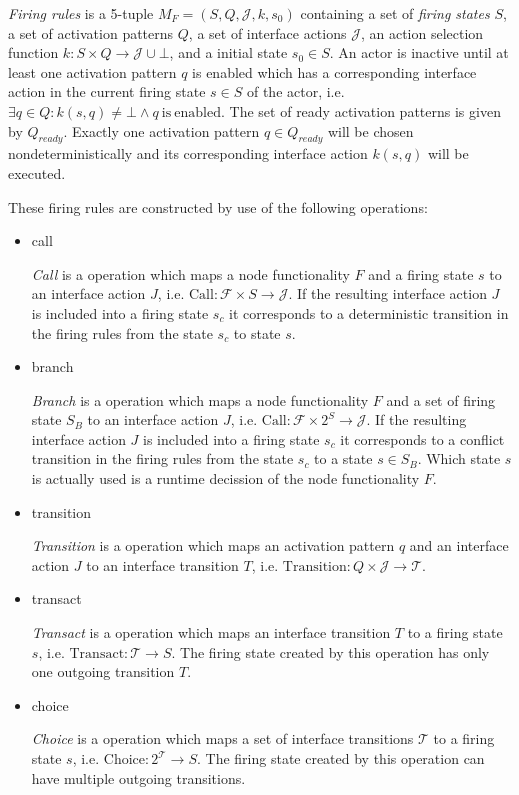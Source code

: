 \begin{definition}\label{firing-rules}
\emph{Firing rules} is a 5-tuple $M_{F} = (S, Q, \mathcal{J}, k, s_0)$ containing
a set of \emph{firing states} $S$, a set of activation patterns $Q$,
a set of interface actions $\mathcal{J}$, an action selection function
$k: S \times Q \to \mathcal{J} \cup \bot$,
and a initial state $s_0 \in S$. An actor is inactive until at least
one activation pattern $q$ is enabled which has a corresponding
interface action in the current firing state $s \in S$ of the actor,
i.e. $\exists{q \in Q}: k(s,q) \ne \bot \wedge q\ \mathrm{is\ enabled}$.
The set of ready activation patterns is given by $Q_{ready}$.
Exactly one activation pattern $q \in Q_{ready}$ will be
chosen nondeterministically and its corresponding interface action
$k(s,q)$ will be executed.
\end{definition}

These firing rules are constructed by use of the following operations:

\begin{itemize}
\item call

\emph{Call} is a operation which maps a node functionality $F$ and
a firing state $s$ to an interface action $J$,
i.e. $\mathrm{Call}: \mathcal{F} \times S \to \mathcal{J}$.
If the resulting interface action $J$ is included into a
firing state $s_{c}$ it corresponds to a deterministic transition
in the firing rules from the state $s_{c}$ to state $s$.

\item branch

\emph{Branch} is a operation which maps a node functionality $F$ and
a set of firing state $S_{B}$ to an interface action $J$,
i.e. $\mathrm{Call}: \mathcal{F} \times 2^S \to \mathcal{J}$.
If the resulting interface action $J$ is included into a
firing state $s_{c}$ it corresponds to a conflict transition
in the firing rules from the state $s_{c}$ to a state $s \in S_{B}$.
Which state $s$ is actually used is a runtime decission
of the node functionality $F$.

\item transition

\emph{Transition} is a operation which maps an activation pattern $q$ and
an interface action $J$ to an interface transition $T$,
i.e. $\mathrm{Transition}: Q \times \mathcal{J} \to \mathcal{T}$.

\item transact

\emph{Transact} is a operation which maps an interface transition $T$
to a firing state $s$,
i.e. $\mathrm{Transact}: \mathcal{T} \to S$.
The firing state created by this operation has only one outgoing
transition $T$.

\item choice

\emph{Choice} is a operation which maps a set of interface transitions $\mathcal{T}$
to a firing state $s$,
i.e. $\mathrm{Choice}: 2^{\mathcal{T}} \to S$.
The firing state created by this operation can have multiple outgoing
transitions.

\end{itemize}

